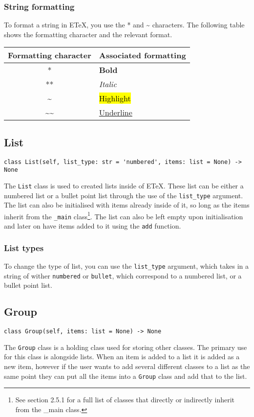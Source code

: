 \documentclass{article}
\begin{document}
\subsubsection[String formatting]{String formatting}
To format a string in ETeX, you use the * and \~{} characters. The following table shows the formatting character and the relevant format.\\
\begin{center}
\begin{tabular}{| c | l |}
\hline
Formatting character & Associated formatting \\ \hline
* & \textbf{Bold} \\
** & \textit{Italic} \\
\~{} & \hl{Highlight} \\
\~{}\~{} & \underline{Underline} \\
\hline
\end{tabular}
\end{center}

\subsection[List]{List}
\lstset{language=python}
\begin{lstlisting}
class List(self, list_type: str = 'numbered', items: list = None) -> None
\end{lstlisting}
The \verb|List| class is used to created lists inside of ETeX. These list can be either a numbered list or a bullet point list through the use of the \verb|list_type| argument. The list can also be initialised with items already inside of it, so long as the items inherit from the \verb|_main| class\footnote{See section 2.5.1 for a full list of classes that directly or indirectly inherit from the \_main class.}. The list can also be left empty upon initialisation and later on have items added to it using the \verb|add| function.
\subsubsection[List types]{List types}
To change the type of list, you can use the \verb|list_type| argument, which takes in a string of wither \verb|numbered| or \verb|bullet|, which correspond to a numbered list, or a bullet point list.
\subsection[Group]{Group}
\lstset{language=python}
\begin{lstlisting}
class Group(self, items: list = None) -> None
\end{lstlisting}
The \verb|Group| class is a holding class used for storing other classes. The primary use for this class is alongside lists. When an item is added to a list it is added as a new item, however if the user wants to add several different classes to a list as the same point they can put all the items into a \verb|Group| class and add that to the list.
\end{document}

